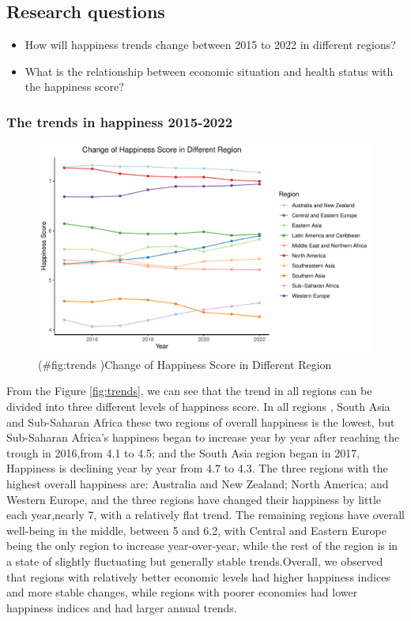 \documentclass[11pt,a4paper,]{article}
\begin{document}
\hypertarget{research-questions}{%
\subsection{Research questions}\label{research-questions}}

\begin{itemize}
\item
  How will happiness trends change between 2015 to 2022 in different regions?
\item
  What is the relationship between economic situation and health status with the happiness score?
\end{itemize}

\hypertarget{the-trends-in-happiness-2015-2022}{%
\subsubsection{The trends in happiness 2015-2022}\label{the-trends-in-happiness-2015-2022}}

\begin{figure}
\centering
\includegraphics{Assignment4_files/figure-latex/trends -1.pdf}
\caption{(\#fig:trends )Change of Happiness Score in Different Region}
\end{figure}

From the Figure \ref{fig:trends}, we can see that the trend in all regions can be divided into three different levels of happiness score. In all regions , South Asia and Sub-Saharan Africa these two regions of overall happiness is the lowest, but Sub-Saharan Africa's happiness began to increase year by year after reaching the trough in 2016,from 4.1 to 4.5; and the South Asia region began in 2017, Happiness is declining year by year from 4.7 to 4.3. The three regions with the highest overall happiness are: Australia and New Zealand; North America; and Western Europe, and the three regions have changed their happiness by little each year,nearly 7, with a relatively flat trend. The remaining regions have overall well-being in the middle, between 5 and 6.2, with Central and Eastern Europe being the only region to increase year-over-year, while the rest of the region is in a state of slightly fluctuating but generally stable trends.Overall, we observed that regions with relatively better economic levels had higher happiness indices and more stable changes, while regions with poorer economies had lower happiness indices and had larger annual trends.
\end{document}
